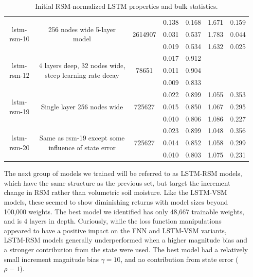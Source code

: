 \begin{table}[H]
\begin{sideways}
\begin{tabular}{c|c|c|c|c|c|c }
\hline
\multirow{3}{6em}{lstm-rsm-10} & \multirow{3}{16em}{256 nodes wide 5-layer model} & \multirow{3}{4em}{2614907} & 0.138 & 0.168 & 1.671 & 0.159 \\ & & & 0.031 & 0.537 & 1.783 & 0.044 \\ & & & 0.019 & 0.534 & 1.632 & 0.025 \\
\hline
\multirow{3}{6em}{lstm-rsm-12} & \multirow{3}{16em}{4 layers deep, 32 nodes wide, steep learning rate decay} & \multirow{3}{4em}{78651} & 0.017 & 0.912 &  &  \\ & & & 0.011 & 0.904 &  &  \\ & & & 0.009 & 0.833 &  &  \\
\hline
\multirow{3}{6em}{lstm-rsm-19} & \multirow{3}{16em}{Single layer 256 nodes wide} & \multirow{3}{4em}{725627} & 0.022 & 0.899 & 1.055 & 0.353 \\ & & & 0.015 & 0.850 & 1.067 & 0.295 \\ & & & 0.010 & 0.806 & 1.086 & 0.227 \\
\hline
\multirow{3}{6em}{lstm-rsm-20} & \multirow{3}{16em}{Same as rsm-19 except some influence of state error} & \multirow{3}{4em}{725627} & 0.023 & 0.899 & 1.048 & 0.356 \\ & & & 0.014 & 0.852 & 1.058 & 0.299 \\ & & & 0.010 & 0.803 & 1.075 & 0.231 \\
    \end{tabular}
\centering
\end{sideways}
    \caption{Initial RSM-normalized LSTM properties and bulk statistics.}
    \label{model-init-lstm-rsm-table}
\end{table}

The next group of models we trained will be referred to as LSTM-RSM models, which have the same structure as the previous set, but target the increment change in RSM rather than volumetric soil moisture. Like the LSTM-VSM models, these seemed to show diminishing returns with model sizes beyond 100,000 weights. The best model we identified has only 48,667 trainable weights, and is 4 layers in depth. Curiously, while the loss function manipulations appeared to have a positive impact on the FNN and LSTM-VSM variants, LSTM-RSM models generally underperformed when a higher magnitude bias and a stronger contribution from the state were used. The best model had a relatively small increment magnitude bias $\gamma=10$, and no contribution from state error ($\rho=1$).


